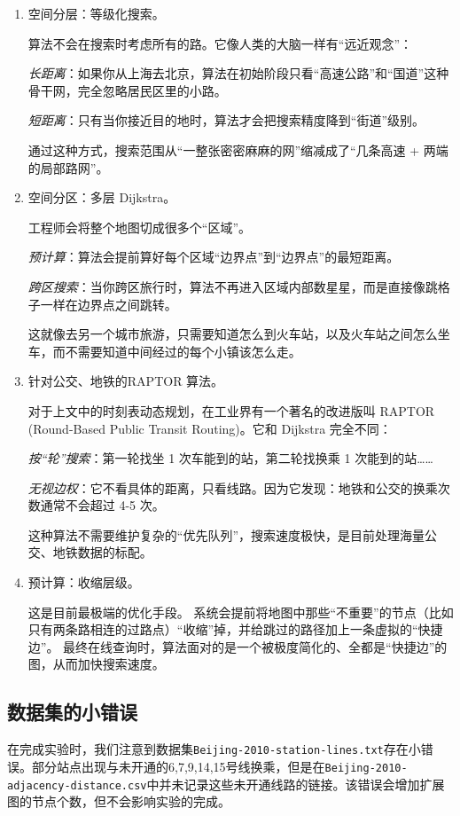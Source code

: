 	\begin{enumerate}
		\item 空间分层：等级化搜索。
		
		算法不会在搜索时考虑所有的路。它像人类的大脑一样有“远近观念”：
		
		\textit{长距离}：如果你从上海去北京，算法在初始阶段只看“高速公路”和“国道”这种骨干网，完全忽略居民区里的小路。
		
		\textit{短距离}：只有当你接近目的地时，算法才会把搜索精度降到“街道”级别。
		
		通过这种方式，搜索范围从“一整张密密麻麻的网”缩减成了“几条高速 + 两端的局部路网”。
		
		\item 空间分区：多层 Dijkstra。
		
		工程师会将整个地图切成很多个“区域”。
		
		\textit{预计算}：算法会提前算好每个区域“边界点”到“边界点”的最短距离。
		
		\textit{跨区搜索}：当你跨区旅行时，算法不再进入区域内部数星星，而是直接像跳格子一样在边界点之间跳转。
		
		这就像去另一个城市旅游，只需要知道怎么到火车站，以及火车站之间怎么坐车，而不需要知道中间经过的每个小镇该怎么走。
		
		\item 针对公交、地铁的RAPTOR 算法。
		
		对于上文中的时刻表动态规划，在工业界有一个著名的改进版叫 RAPTOR (Round-Based Public Transit Routing)。它和 Dijkstra 完全不同：
		
		\textit{按“轮”搜索}：第一轮找坐 1 次车能到的站，第二轮找换乘 1 次能到的站……
		
		\textit{无视边权}：它不看具体的距离，只看线路。因为它发现：地铁和公交的换乘次数通常不会超过 4-5 次。
		
		这种算法不需要维护复杂的“优先队列”，搜索速度极快，是目前处理海量公交、地铁数据的标配。
		
		\item 预计算：收缩层级。
		
		这是目前最极端的优化手段。
		系统会提前将地图中那些“不重要”的节点（比如只有两条路相连的过路点）“收缩”掉，并给跳过的路径加上一条虚拟的“快捷边”。
		最终在线查询时，算法面对的是一个被极度简化的、全都是“快捷边”的图，从而加快搜索速度。
	\end{enumerate}
	
	
	\subsection{数据集的小错误}
	
	在完成实验时，我们注意到数据集\texttt{Beijing-2010-station-lines.txt}存在小错误。部分站点出现与未开通的6,7,9,14,15号线换乘，但是在\texttt{Beijing-2010-adjacency-distance.csv}中并未记录这些未开通线路的链接。该错误会增加扩展图的节点个数，但不会影响实验的完成。
	




